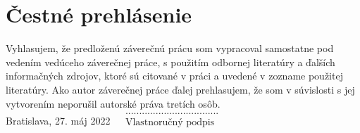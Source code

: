 \null
\vfill
\noindent
\section*{Čestné prehlásenie}

Vyhlasujem, že predloženú záverečnú prácu som vypracoval samostatne pod vedením vedúceho záverečnej práce, s použitím odbornej literatúry a ďalších informačných zdrojov, ktoré sú citované v práci a uvedené v zozname použitej literatúry. Ako autor záverečnej práce ďalej prehlasujem, že som v súvislosti s jej vytvorením neporušil autorské práva tretích osôb.\\

\noindent Bratislava, 27. máj 2022 \hfill $\begin{array}{rl}
                                          &\text{..................................}\\
                                          &\text{Vlastnoručný podpis}\\
                                           \end{array}$
\cleardoublepage


	
